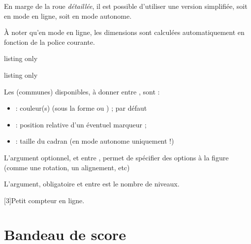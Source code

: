 \documentclass[french,11pt,a4paper]{article}
\begin{document}
En marge de la roue \textit{détaillée}, il est possible d'utiliser une version simplifiée, soit en mode en ligne, soit en mode autonome.

\smallskip

À noter qu'en mode en ligne, les dimensions sont calculées automatiquement en fonction de la police courante.

\begin{DemoCode}{listing only}
\end{DemoCode}

\begin{DemoCode}{listing only}
\end{DemoCode}

Les  (communes) disponibles, à donner entre \MontreCode{[...]}, sont :

\begin{itemize}
	\item {} : couleur(s) (sous la forme  ou ) ;  par défaut
	\item {} : position relative d'un éventuel marqueur ;
	\item {} : taille du cadran (en mode autonome uniquement !)
\end{itemize}

L'argument optionnel, et entre , permet de spécifier des options à la figure  (comme une rotation, un alignement, etc)

\smallskip

L'argument, obligatoire et entre  est le nombre de niveaux.

\begin{DemoCode}{}
\scalebox{3}[3]{Petit compteur  en ligne.}
\end{DemoCode}

\begin{DemoCode}{}
\end{DemoCode}

\pagebreak

\section{Bandeau de score}
\end{document}
